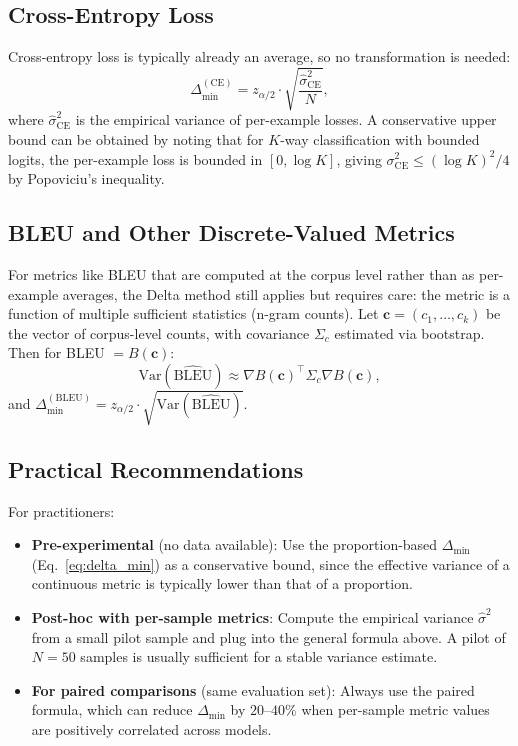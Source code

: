 \documentclass[pdflatex,sn-mathphys-ay,oneside]{sn-jnl}
\theoremstyle{thmstylethree}
\begin{document}
\subsection{Cross-Entropy Loss}

Cross-entropy loss is typically already an average, so no transformation is needed:
\[
\Delta_{\min}^{(\text{CE})} = z_{\alpha/2} \cdot \sqrt{\frac{\hat\sigma_{\text{CE}}^2}{N}},
\]
where $\hat\sigma_{\text{CE}}^2$ is the empirical variance of per-example losses. A conservative upper bound can be obtained by noting that for $K$-way classification with bounded logits, the per-example loss is bounded in $[0, \log K]$, giving $\sigma_{\text{CE}}^2 \leq (\log K)^2/4$ by Popoviciu's inequality.

\subsection{BLEU and Other Discrete-Valued Metrics}

For metrics like BLEU that are computed at the corpus level rather than as per-example averages, the Delta method still applies but requires care: the metric is a function of multiple sufficient statistics (n-gram counts). Let $\mathbf{c} = (c_1,\dots,c_k)$ be the vector of corpus-level counts, with covariance $\Sigma_c$ estimated via bootstrap. Then for BLEU $= B(\mathbf{c})$:
\[
\mathrm{Var}(\widehat{\text{BLEU}}) \approx \nabla B(\mathbf{c})^\top \Sigma_c \nabla B(\mathbf{c}),
\]
and $\Delta_{\min}^{(\text{BLEU})} = z_{\alpha/2} \cdot \sqrt{\mathrm{Var}(\widehat{\text{BLEU}})}$.

\subsection{Practical Recommendations}

For practitioners:
\begin{itemize}
    \item \textbf{Pre-experimental} (no data available): Use the proportion-based $\Delta_{\min}$ (Eq.~\ref{eq:delta_min}) as a conservative bound, since the effective variance of a continuous metric is typically lower than that of a proportion.
    \item \textbf{Post-hoc with per-sample metrics}: Compute the empirical variance $\hat\sigma^2$ from a small pilot sample and plug into the general formula above. A pilot of $N=50$ samples is usually sufficient for a stable variance estimate.
    \item \textbf{For paired comparisons} (same evaluation set): Always use the paired formula, which can reduce $\Delta_{\min}$ by $20$--$40\%$ when per-sample metric values are positively correlated across models.
\end{itemize}
\end{document}

